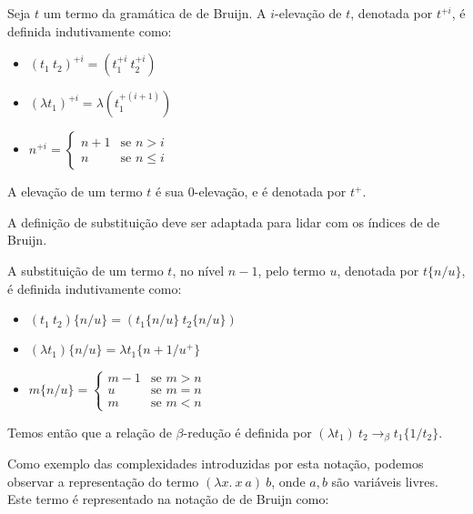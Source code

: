 \begin{definicao} Seja $t$ um termo da gramática de de Bruijn. A
    $i$-elevação de $t$, denotada por $t^{+i}$, é definida indutivamente como:
    \begin{itemize}
        \item $(t_1\ t_2)^{+i} = (t_1^{+i}\ t_2^{+i})$
        \item $(\lambda t_1)^{+i} = \lambda (t_1^{+(i+1)})$
        \item $n^{+i} = \begin{cases}
                            n + 1   & \text{se } n > i \\
                            n       & \text{se } n \leq i
                        \end{cases}$
    \end{itemize}
    A elevação de um termo $t$ é sua $0$-elevação, e é denotada por $t^+$.
    
\end{definicao}

A definição de substituição deve ser adaptada para lidar com os índices de de
Bruijn.

\begin{definicao} A substituição de um termo $t$, no nível $n -
    1$, pelo termo $u$,
    denotada por $t\{n/u\}$, é definida indutivamente como:
    \begin{itemize}
        \item $(t_1\ t_2)\{n/u\} = (t_1\{n/u\}\ t_2\{n/u\})$
        \item $(\lambda t_1)\{n/u\} = \lambda t_1\{n+1/u^+\}$
        \item $m\{n/u\} = \begin{cases}
                             m - 1 & \text{se } m > n \\
                             u     & \text{se } m = n \\
                             m     & \text{se } m < n
                          \end{cases}$
    \end{itemize}
\end{definicao}


\smallskip
Temos então que a relação de $\beta$-redução é definida por $(\lambda t_1)\ t_2
\rightarrow_{\beta} t_1\{1/t_2\}$.
\smallskip

Como exemplo das complexidades introduzidas por esta notação, podemos observar a
representação do termo $(\lambda x.\ x\ a)\ b$, onde $a,b$ são
variáveis livres. Este termo é representado na notação de de Bruijn como:

